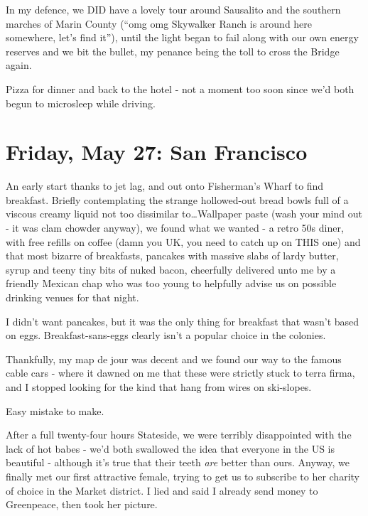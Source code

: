 \documentclass[a5paper,10pt,titlepage,draft]{book}
\begin{document}
In my defence, we DID have a lovely tour around Sausalito and the southern marches of Marin County (``omg omg Skywalker Ranch is around here somewhere, let's find it''), until the light began to fail along with our own energy reserves and we bit the bullet, my penance being the toll to cross the Bridge again.

Pizza for dinner and back to the hotel - not a moment too soon since we'd both begun to microsleep while driving.

\chapter[San Francisco]{Friday, May 27: San Francisco}
An early start thanks to jet lag, and out onto Fisherman's Wharf to find breakfast.  Briefly contemplating the strange hollowed-out bread bowls full of a viscous creamy liquid not too dissimilar to\ldots  Wallpaper paste (wash your mind out - it was clam chowder anyway), we found what we wanted - a retro 50s diner, with free refills on coffee (damn you UK, you need to catch up on THIS one) and that most bizarre of breakfasts, pancakes with massive slabs of lardy butter, syrup and teeny tiny bits of nuked bacon, cheerfully delivered unto me by a friendly Mexican chap who was too young to helpfully advise us on possible drinking venues for that night.

I didn't want pancakes, but it was the only thing for breakfast that wasn't based on eggs.  Breakfast-sans-eggs clearly isn't a popular choice in the colonies.

Thankfully, my map de jour was decent and we found our way to the famous cable cars - where it dawned on me that these were strictly stuck to terra firma, and I stopped looking for the kind that hang from wires on ski-slopes.

Easy mistake to make.

After a full twenty-four hours Stateside, we were terribly disappointed with the lack of hot babes - we'd both swallowed the idea that everyone in the US is beautiful - although it's true that their teeth \emph{are} better than ours.  Anyway, we finally met our first attractive female, trying to get us to subscribe to her charity of choice in the Market district.  I lied and said I already send money to Greenpeace, then took her picture.
\end{document}
